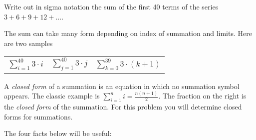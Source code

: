 \documentclass[12pt,addpoints]{exam}
\newcommand{\ds}{\displaystyle}
\begin{document}
\begin{questions}
\begin{solution}
\end{solution}


\question[4] Write out in sigma notation the sum of the first 40 terms of the series $3 + 6 + 9 + 12 + \ldots$.
    \ifprintanswers
        \vspace{-10pt}
   \fi
\begin{solution}
    The sum can take many form depending on index of summation and limits.  Here are two samples

\begin{center}
\begin{tabular}{ccc}
   $\ds \sum_{i=1}^{40} 3\cdot i$ \hspace{0.25in} & $\ds \sum_{j=1}^{40} 3\cdot j$ \hspace{0.25in} &
    $\ds \sum_{k=0}^{39} 3\cdot (k+1)$
\end{tabular}
\end{center}
\end{solution}


\question[12] A \textit{closed form} of a summation is an equation
in which no summation symbol appears.  The classic example is
$\displaystyle \sum_{i=1}^n i = \frac{n(n+1)}{2}$.  The fraction on
the right is the \textit{closed form} of the summation.  For this
problem you will determine closed forms for summations.

The four facts below will be useful:


\end{questions}
\end{document}
